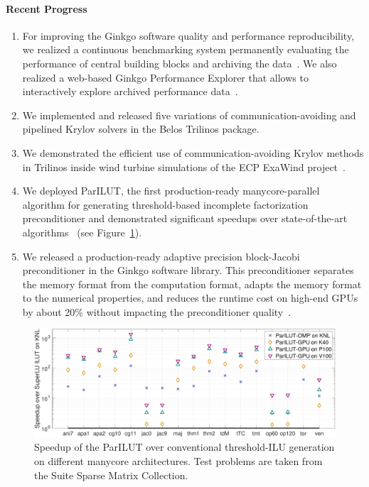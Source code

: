 \paragraph{Recent Progress}
\begin{enumerate}
\item 
For improving the Ginkgo software quality and performance reproducibility, we 
realized a continuous benchmarking system permanently evaluating the 
performance of central building blocks and archiving the data~\cite{pasc_anzt}. 
We 
also realized a web-based Ginkgo Performance Explorer that allows to 
interactively explore archived performance 
data~\cite{gpewebpage}.
\item
We implemented and released five variations of communication-avoiding
and pipelined Krylov solvers in the Belos Trilinos package.
\item
We demonstrated the efficient use of communication-avoiding Krylov methods in Trilinos
inside wind turbine simulations of the ECP ExaWind project~\cite{Yamazaki-lowsynch}.
\item 
We deployed ParILUT, the first production-ready manycore-parallel algorithm for 
generating threshold-based incomplete factorization preconditioner and 
demonstrated significant speedups over state-of-the-art 
algorithms~\cite{ipdps_anzt} (see Figure~\ref{fig:ParILUTperf}).
\item
We released a production-ready adaptive precision block-Jacobi preconditioner 
in the Ginkgo software library. This preconditioner separates the memory format 
from the computation format, adapts the memory format to the numerical 
properties, and reduces the runtime cost on high-end GPUs by about 20\% without 
impacting the preconditioner quality~\cite{toms_anzt}.
\end{enumerate}

\begin{figure}[htb]
	\centering
	\includegraphics[width=6in]{projects/2.3.3-MathLibs/2.3.3.13-CLOVER/parilutspeedup}
	\caption{\label{fig:ParILUTperf}Speedup of the ParILUT over conventional 
	threshold-ILU generation on different manycore architectures. Test problems 
	are taken from the Suite Sparse Matrix Collection.}
\end{figure}


